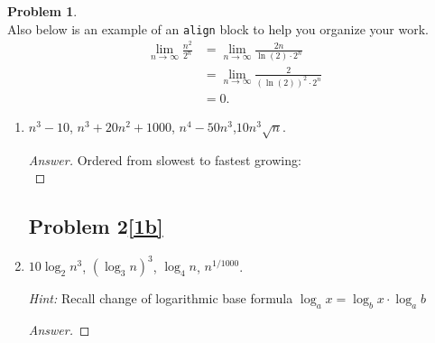 \documentclass[11pt]{article}
\theoremstyle{definition}
\theoremstyle{definition}
\newtheorem{required}{Problem}
\theoremstyle{definition}
\begin{document}
\begin{required}
\noindent \\ Also below is an example of an \texttt{align} block to help you organize your work.
\begin{align*}
\lim_{n \to \infty} \frac{n^{2}}{2^{n}} &= \lim_{n \to \infty} \frac{2n}{\ln(2) \cdot 2^{n}} \\
&= \lim_{n \to \infty} \frac{2}{(\ln(2))^{2} \cdot 2^{n}} \\
&= 0.
\end{align*}
\newpage
\begin{enumerate} [label=(\alph*)]
\subsection{Problem 2\ref{1a}}
    \item \label{1a} $ n^3-10$, \qquad  $ n^3+20n^2+1000$, \qquad $n^4-50n^3$,\qquad  $10n^3\sqrt{n}$.
    \begin{proof}[Answer]
    
    Ordered from slowest to fastest growing: \\
    
    

    \end{proof}
    
    
    
        
    \newpage
\subsection{Problem 2\ref{1b}}
    \item \label{1b} $10 \log_2 n^3$, \qquad $(\log_3 n)^3 $,  $\log_4 n$,  \qquad $n^{1/1000}$.
    
    \emph{Hint:} Recall change of logarithmic base formula $\log_a x = \log_b x\cdot\log_a b$
    \begin{proof}[Answer]

    \end{proof}
\end{enumerate}

\end{required}

\newpage
\end{document}
